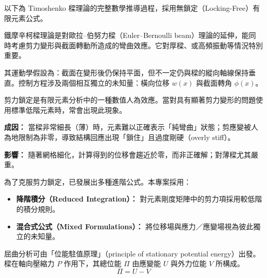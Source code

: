 ﻿\documentclass[UTF8, a4paper, 12pt]{ctexart}
\begin{document}
以下為 Timoshenko 樑理論的完整數學推導過程，採用無鎖定（Locking-Free）有限元素公式。


鐵摩辛柯樑理論是對歐拉–伯努力樑（Euler–Bernoulli beam）理論的延伸，能同時考慮剪力變形與截面轉動所造成的彎曲效應。它對厚樑、或高頻振動等情況特別重要。

其運動學假設為：截面在變形後仍保持平面，但不一定仍與樑的縱向軸線保持垂直。控制方程涉及兩個相互獨立的未知量：橫向位移 $w(x)$ 與截面轉角 $\phi(x)$。


剪力鎖定是有限元素分析中的一種數值人為效應。當對具有顯著剪力變形的問題使用標準低階元素時，常會出現此現象。

\textbf{成因：} 當樑非常細長（薄）時，元素難以正確表示「純彎曲」狀態；剪應變被人為地限制為非零，導致結構回應出現「鎖住」且過度剛硬（overly stiff）。

\textbf{影響：} 隨著網格細化，計算得到的位移會趨近於零，而非正確解；對薄樑尤其嚴重。


為了克服剪力鎖定，已發展出多種進階公式。本專案採用：
\begin{itemize}
  \item \textbf{降階積分（Reduced Integration）：} 對元素剛度矩陣中的剪力項採用較低階的積分規則。
  \item \textbf{混合式公式（Mixed Formulations）：} 將位移場與應力／應變場視為彼此獨立的未知量。
\end{itemize}


屈曲分析可由「位能駐值原理」（principle of stationary potential energy）出發。樑在軸向壓縮力 $P$ 作用下，其總位能 $\Pi$ 由應變能 $U$ 與外力位能 $V$ 所構成。
\begin{equation}
  \Pi = U - V
\end{equation}
\end{document}
